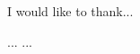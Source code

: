 \documentclass{report}
\begin{document}
    I would like to thank...
    \afterpreface

    
    
    ...
    ...
    \printbibliography[heading=bibintoc]
\end{document}
